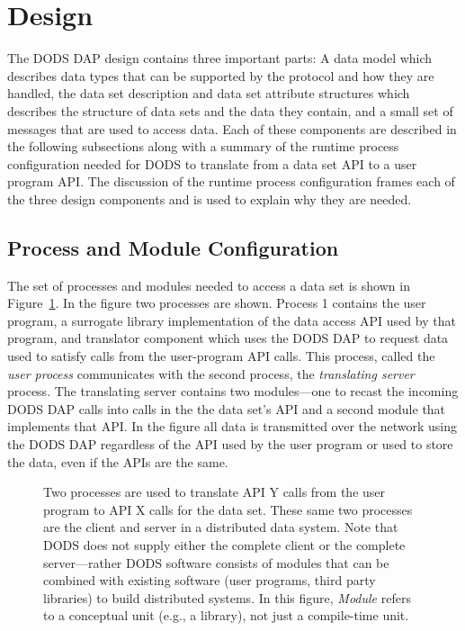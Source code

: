 \section{Design}
\label{design}

The DODS DAP design contains three important parts: A data model which
describes data types that can be supported by the protocol and how they are
handled, the data set description and data set attribute structures which
describes the structure of data sets and the data they contain, and a small
set of messages that are used to access data. Each of these components are
described in the following subsections along with a summary of the runtime
process configuration needed for DODS to translate from a data set API to a
user program API\@. The discussion of the runtime process configuration
frames each of the three design components and is used to explain why they
are needed.

\subsection{Process and Module Configuration}
\label{process}

The set of processes and modules needed to access a data set is shown in
Figure~\ref{fig:structure}. In the figure two processes are shown. Process 1
contains the user program, a surrogate library implementation of the data
access API used by that program, and translator component which uses the DODS
DAP to request data used to satisfy calls from the user-program API calls.
This process, called the {\em user process\/} communicates with the second
process, the {\em translating server\/} process.  The translating server
contains two modules---one to recast the incoming DODS DAP calls into calls
in the the data set's API and a second module that implements that API\@. In
the figure all data is transmitted over the network using the DODS DAP
regardless of the API used by the user program or used to store the data,
even if the APIs are the same.

\begin{figure}
\centerline{}
\caption{Two processes are used to translate API Y calls from the user
  program to API X calls for the data set. These same two processes are the
  client and server in a distributed data system. Note that DODS does not
  supply either the complete client or the complete server---rather DODS
  software consists of modules that can be combined with existing software
  (user programs, third party libraries) to build distributed systems. In
  this figure, {\em Module\/} refers to a conceptual unit (e.g., a library),
  not just a compile-time unit.}
\label{fig:structure}
\end{figure}

